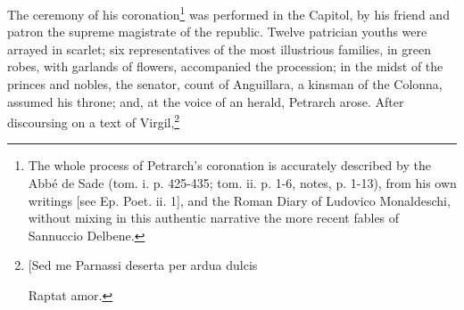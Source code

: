 The ceremony of his coronation\footnote{The whole process of Petrarch\texthebrew{}’s coronation is accurately described by the Abbé de Sade (tom. i. p. 425-435; tom. ii. p. 1-6, notes, p. 1-13), from his own writings [see Ep. Poet. ii. 1], and the Roman Diary of Ludovico Monaldeschi, without mixing in this authentic narrative the more recent fables of Sannuccio Delbene.} was performed in the Capitol, by his friend and patron the supreme magistrate of the republic. Twelve patrician youths were arrayed in scarlet; six representatives of the most illustrious families, in green robes, with garlands of flowers, accompanied the procession; in the midst of the princes and nobles, the senator, count of Anguillara, a kinsman of the Colonna, assumed his throne; and, at the voice of an herald, Petrarch arose. After discoursing on a text of Virgil,\footnote{[Sed me Parnassi deserta per ardua dulcis

Raptat amor.

}
